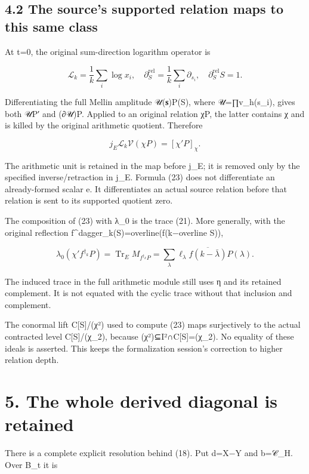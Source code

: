 \documentclass[
  11pt,
]{article}
\begin{document}
\subsection{4.2 The source's supported relation maps to this same
class}\label{the-sources-supported-relation-maps-to-this-same-class}

At t=0, the original sum-direction logarithm operator is

\[
\mathscr L_k=\frac1k\sum_i\log x_i,
\quad
\partial_S^{\mathrm{rel}}=\frac1k\sum_i\partial_{s_i},
\quad\partial_S^{\mathrm{rel}}S=1.
\tag{22}
\]

Differentiating the full Mellin amplitude 𝒰(𝐬)P(S), where 𝒰=∏v\_h(s\_i),
gives both 𝒰P′ and (∂𝒰)P. Applied to an original relation χP, the latter
contains χ and is killed by the original arithmetic quotient. Therefore

\[
\boxed{j_E\mathscr L_k\mathcal V(\chi P)=[\chi'P]_\chi.}
\tag{23}
\]

The arithmetic unit is retained in the map before j\_E; it is removed
only by the specified inverse/retraction in j\_E. Formula (23) does not
differentiate an already-formed scalar e. It differentiates an actual
source relation before that relation is sent to its supported quotient
zero.

The composition of (23) with λ\_0 is the trace (21). More generally,
with the original reflection f\^{}dagger\_k(S)=overline(f(k−overline
S)),

\[
\lambda_0(\chi' f^{\dagger_k}P)
 =\operatorname{Tr}_E M_{f^{\dagger_k}P}
 =\sum_\lambda\ell_\lambda\overline{f(k-\bar\lambda)}P(\lambda).
\tag{24}
\]

The induced trace in the full arithmetic module still uses η and its
retained complement. It is not equated with the cyclic trace without
that inclusion and complement.

The conormal lift C{[}S{]}/(χ²) used to compute (23) maps surjectively
to the actual contracted level C{[}S{]}/(χ\_2), because
(χ²)⊆I²∩C{[}S{]}=(χ\_2). No equality of these ideals is asserted. This
keeps the formalization session's correction to higher relation depth.

\section{5. The whole derived diagonal is
retained}\label{the-whole-derived-diagonal-is-retained}

There is a complete explicit resolution behind (18). Put d=X−Y and
b=𝒞\_H. Over B\_t it is
\end{document}
